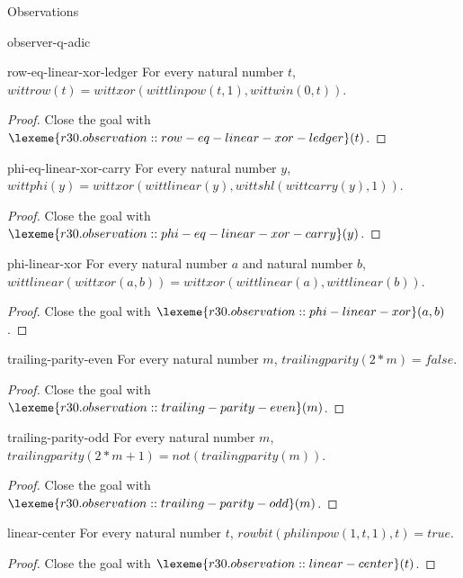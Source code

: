 \begin{lexlean}{Observations}
\begin{section}{observer-q-adic}
\begin{theorem}{row-eq-linear-xor-ledger}
For every natural number \(t\), \(wittrow(t) = wittxor(wittlinpow(t, 1), wittwin(0, t))\).
\begin{proof}
Close the goal with \(\lexeme{r30.observation::row-eq-linear-xor-ledger}(t)\).
\end{proof}
\end{theorem}

\begin{theorem}{phi-eq-linear-xor-carry}
For every natural number \(y\), \(wittphi(y) = wittxor(wittlinear(y), wittshl(wittcarry(y), 1))\).
\begin{proof}
Close the goal with \(\lexeme{r30.observation::phi-eq-linear-xor-carry}(y)\).
\end{proof}
\end{theorem}

\begin{theorem}{phi-linear-xor}
For every natural number \(a\) and natural number \(b\), \(wittlinear(wittxor(a, b)) = wittxor(wittlinear(a), wittlinear(b))\).
\begin{proof}
Close the goal with \(\lexeme{r30.observation::phi-linear-xor}(a, b)\).
\end{proof}
\end{theorem}

\begin{theorem}{trailing-parity-even}
For every natural number \(m\), \(trailingparity(2 * m) = false\).
\begin{proof}
Close the goal with \(\lexeme{r30.observation::trailing-parity-even}(m)\).
\end{proof}
\end{theorem}

\begin{theorem}{trailing-parity-odd}
For every natural number \(m\), \(trailingparity(2 * m + 1) = not(trailingparity(m))\).
\begin{proof}
Close the goal with \(\lexeme{r30.observation::trailing-parity-odd}(m)\).
\end{proof}
\end{theorem}

\begin{theorem}{linear-center}
For every natural number \(t\), \(rowbit(philinpow(1, t, 1), t) = true\).
\begin{proof}
Close the goal with \(\lexeme{r30.observation::linear-center}(t)\).
\end{proof}
\end{theorem}


\end{section}
\end{lexlean}
